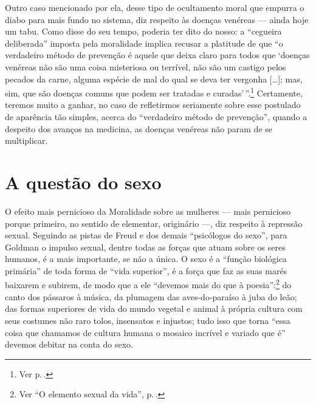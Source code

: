 Outro caso mencionado por ela, desse
tipo de ocultamento moral que empurra o diabo para mais fundo no
sistema, diz respeito às doenças venéreas --- ainda hoje um tabu. Como
disse do seu tempo, poderia ter dito do nosso: a ``cegueira deliberada''
imposta pela moralidade implica recusar a platitude de que ``o
verdadeiro método de prevenção é aquele que deixa claro para todos que
`doenças venéreas não são uma coisa misteriosa ou terrível, não são um
castigo pelos pecados da carne, alguma espécie de mal do qual se deva
ter vergonha {[}\ldots{]}; mas, sim, que são doenças comuns que podem ser
tratadas e curadas'\,''.\footnote{Ver p.\,\pageref{std}.} Certamente, teremos muito a ganhar, no caso de refletirmos seriamente sobre esse postulado de aparência tão simples,
acerca do ``verdadeiro método de prevenção'', quando a despeito dos
avanços na medicina, as doenças venéreas não param de se multiplicar.

\section{A questão do sexo}

O efeito mais pernicioso da Moralidade sobre as mulheres --- mais
pernicioso porque primeiro, no sentido de elementar, originário ---, diz
respeito à repressão sexual. Seguindo as pistas de Freud e dos demais
``psicólogos do sexo'', para Goldman o impulso sexual, dentre todas as forças que atuam
sobre os seres humanos, é a mais importante, se não a única.
O sexo é a ``função biológica primária'' de toda forma de ``vida superior'', é a
força que faz as suas marés baixarem e subirem, de modo que a ele
``devemos mais do que à poesia'':\footnote{Ver ``O elemento sexual da vida'', p.\,\pageref{sexual}.} do canto dos pássaros à música, da
plumagem das aves-do-paraíso à juba do leão; das formas superiores de
vida do mundo vegetal e animal à própria cultura com seus costumes não
raro tolos, insensatos e injustos; tudo isso que torna
``essa coisa que chamamos de cultura humana o mosaico incrível e variado
que é'' devemos debitar na conta do sexo.

